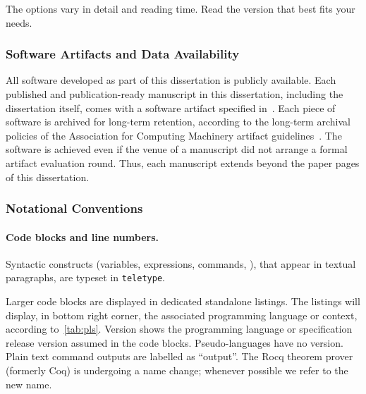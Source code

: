 The options vary in detail and reading time.
Read the version that best fits your needs.

\subsubsection{Software Artifacts and Data Availability}\label{subsub:sw}

All software developed as part of this dissertation is publicly available.
Each published and publication-ready manuscript in this dissertation, including the dissertation itself, comes with a software artifact specified in~.
Each piece of software is archived for long-term retention, according to the long-term archival policies of the Association for Computing Machinery artifact guidelines~\cite{acm_badging}.
The software is achieved even if the venue of a manuscript did not arrange a formal artifact evaluation round.
Thus, each manuscript extends beyond the paper pages of this dissertation.

\subsubsection{Notational Conventions}

\paragraph*{Code blocks and line numbers.}
Syntactic constructs (variables, expressions, commands, \etc), that appear in textual paragraphs, are typeset in \texttt{teletype}.

Larger code blocks are displayed in dedicated standalone listings.
The listings will display, in bottom right corner, the associated programming language or context, according to~\autoref{tab:pls}.
Version shows the programming language or specification release version assumed in the code blocks.
Pseudo-languages have no version.
Plain text command outputs are labelled as \enquote{output}.
The Rocq theorem prover (formerly Coq) is undergoing a name change; whenever possible we refer to the new name.

